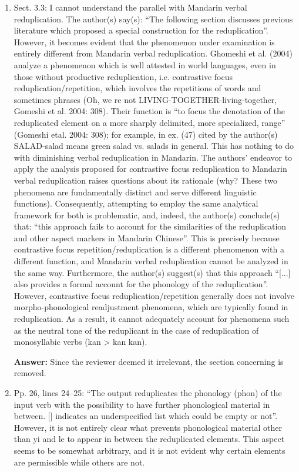 \documentclass[fleqn,twoside]{article}
\begin{document}
\begin{enumerate}
\item
Sect. 3.3: I cannot understand the parallel with Mandarin verbal reduplication. The
author(s) say(s): “The following section discusses previous literature which proposed a special
construction for the reduplication”. However, it becomes evident that the phenomenon under
examination is entirely different from Mandarin verbal reduplication. Ghomeshi et al. (2004) analyze
a phenomenon which is well attested in world languages, even in those without productive
reduplication, i.e. contrastive focus reduplication/repetition, which involves the repetitions of
words and sometimes phrases (Oh, we re not LIVING-TOGETHER-living-together, Gomeshi et al. 2004: 308). Their function is “to focus the denotation of the reduplicated element on a more sharply delimited, more specialized, range” (Gomeshi etal. 2004: 308); for example, in ex. (47) cited by the author(s) SALAD-salad means green salad vs. salads in general. This has nothing to do with diminishing verbal reduplication in Mandarin. The authors’ endeavor to apply the analysis proposed for contrastive focus reduplication to Mandarin verbal reduplication raises questions about its rationale (why? These two phenomena are fundamentally distinct and serve different linguistic functions). Consequently, attempting to employ the same analytical framework for both is problematic, and, indeed, the author(s) conclude(s) that: “this approach fails to account for the similarities of the reduplication and other aspect markers in Mandarin Chinese”. This is precisely because contrastive focus repetition/reduplication is a different phenomenon with a different function, and Mandarin verbal reduplication cannot be analyzed in the same way. Furthermore, the author(s) suggest(s) that this approach “[...] also provides a formal account for the phonology of the reduplication”. However, contrastive focus reduplication/repetition generally does not involve morpho-phonological readjustment phenomena, which are typically found in reduplication. As a result, it cannot adequately account for phenomena such as the neutral tone of the reduplicant in the case of reduplication of monosyllabic verbs (kan > kan kan).


\textbf{Answer:}
Since the reviewer deemed it irrelevant, the section concerning \citet{Ghomeshietal2004} is removed.

\item Pp. 26, lines 24--25: ``The output reduplicates the phonology (phon) of the input verb with the possibility to have further phonological material in between. [] indicates an underspecified list which could be empty or not''. However, it is not entirely clear what prevents phonological material other than yi and le to appear in between the reduplicated elements. This aspect seems to be somewhat arbitrary, and it is not evident why certain elements are permissible while others are not.


\end{enumerate}
\end{document}

